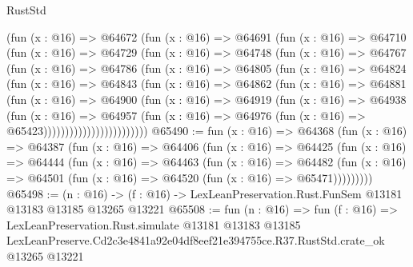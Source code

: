 \begin{lexlean}{RustStd}
\begin{coremodule}
                (fun (x : @16) =>
                @64672
                  (fun (x : @16) =>
                  @64691
                    (fun (x : @16) =>
                    @64710
                      (fun (x : @16) =>
                      @64729
                        (fun (x : @16) =>
                        @64748
                          (fun (x : @16) =>
                          @64767
                            (fun (x : @16) =>
                            @64786
                              (fun (x : @16) =>
                              @64805
                                (fun (x : @16) =>
                                @64824
                                  (fun (x : @16) =>
                                  @64843
                                    (fun (x : @16) =>
                                    @64862
                                      (fun (x : @16) =>
                                      @64881
                                        (fun (x : @16) =>
                                        @64900
                                          (fun (x : @16) =>
                                          @64919
                                            (fun (x : @16) =>
                                            @64938
                                              (fun (x : @16) =>
                                              @64957
                                                (fun (x : @16) =>
                                                @64976
                                                  (fun (x : @16) => @65423))))))))))))))))))))))))
@65490 := fun (x : @16) =>
  @64368
    (fun (x : @16) =>
    @64387
      (fun (x : @16) =>
      @64406
        (fun (x : @16) =>
        @64425
          (fun (x : @16) =>
          @64444
            (fun (x : @16) =>
            @64463
              (fun (x : @16) =>
              @64482
                (fun (x : @16) => @64501 (fun (x : @16) => @64520 (fun (x : @16) => @65471)))))))))
@65498 := (n : @16) ->
  (f : @16) -> LexLeanPreservation.Rust.FunSem @13181 @13183 @13185 @13265 @13221
@65508 := fun (n : @16) =>
  fun (f : @16) =>
  LexLeanPreservation.Rust.simulate
    @13181
    @13183
    @13185
    LexLeanPreserve.Cd2c3e4841a92e04df8eef21e394755ce.R37.RustStd.crate_ok
    @13265
    @13221
\end{coremodule}
\end{lexlean}
